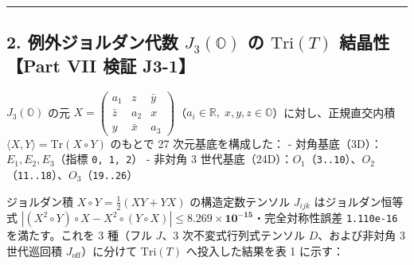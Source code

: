 \documentclass[
  a4paper,
]{ltjsarticle}
\begin{document}
\begin{center}\rule{0.5\linewidth}{0.5pt}\end{center}

\subsection{\texorpdfstring{2. 例外ジョルダン代数 \(J_3(\mathbb{O})\) の
\(\mathrm{Tri}(T)\) 結晶性【Part VII 検証
J3-1】}{2. 例外ジョルダン代数 J\_3(\textbackslash mathbb\{O\}) の \textbackslash mathrm\{Tri\}(T) 結晶性【Part VII 検証 J3-1】}}\label{ux4f8bux5916ux30b8ux30e7ux30ebux30c0ux30f3ux4ee3ux6570-j_3mathbbo-ux306e-mathrmtrit-ux7d50ux6676ux6027part-vii-ux691cux8a3c-j3-1}

\(J_3(\mathbb{O})\) の元
\(X = \begin{pmatrix} a_1 & z & \bar{y} \\ \bar{z} & a_2 & x \\ y & \bar{x} & a_3 \end{pmatrix}\)（\(a_i \in \mathbb{R},\; x, y, z \in \mathbb{O}\)）に対し、正規直交内積
\(\langle X, Y \rangle = \mathrm{Tr}(X \circ Y)\) のもとで 27
次元基底を構成した： - 対角基底（3D）：\(E_1, E_2, E_3\)（指標
\texttt{0,\ 1,\ 2}） - 非対角 3
世代基底（24D）：\(O_1\)（\texttt{3..10}）、\(O_2\)（\texttt{11..18}）、\(O_3\)（\texttt{19..26}）

ジョルダン積 \(X \circ Y = \frac{1}{2}(XY+YX)\) の構造定数テンソル
\(J_{ijk}\) はジョルダン恒等式
\(|(X^2\circ Y)\circ X - X^2\circ(Y\circ X)| \le \mathbf{8.269 \times 10^{-15}}\)・完全対称性誤差
\texttt{1.110e-16} を満たす。これを 3 種（フル \(J\)、3
次不変式行列式テンソル \(D\)、および非対角 3 世代巡回積
\(J_{\mathrm{off}}\)）に分けて \(\mathrm{Tri}(T)\) へ投入した結果を表 1
に示す：
\end{document}
